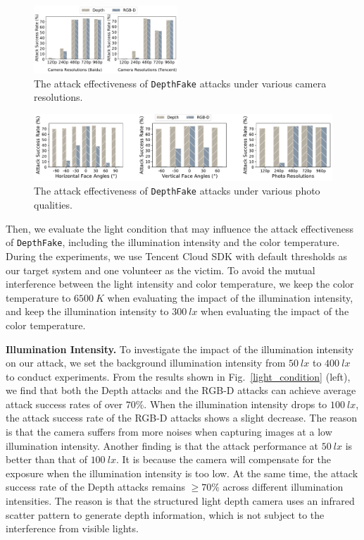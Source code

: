 \begin{figure}[pt]
	\centerline{\includegraphics[width = 0.48\textwidth]{figures/camera_resolution.pdf}}
	\vspace{-0.15in}
	\caption{The attack effectiveness of \texttt{DepthFake} attacks under various camera resolutions.}
	\label{camera_resolution}
	\vspace{-0.15in}
\end{figure}


\begin{figure}[pt]
	\centerline{\includegraphics[width = \textwidth]{figures/photo_quality.pdf}}
	\vspace{-0.15in}
	\caption{The attack effectiveness of \texttt{DepthFake} attacks under various photo qualities. }
	\label{photo_quality}
	\vspace{-0.15in}
\end{figure}


Then, we evaluate the light condition that may influence the attack effectiveness of \texttt{DepthFake}, including the illumination intensity and the color temperature. During the experiments, we use Tencent Cloud SDK with default thresholds as our target system and one volunteer as the victim.  
To avoid the mutual interference between the light intensity and color temperature, we keep the color temperature to $6500~K$ when evaluating the impact of the illumination intensity, and keep the illumination intensity to $300~lx$ when evaluating the impact of the color temperature.

\textbf{Illumination Intensity.} To investigate the impact of the illumination intensity on our attack, we set the background illumination intensity from $50~lx$ to $400~lx$ to conduct experiments.
From the results shown in Fig.~\ref{light_condition} (left), we find that both the Depth attacks and the RGB-D attacks can achieve average attack success rates of over $70\%$.
When the illumination intensity drops to $100~lx$, the attack success rate of the RGB-D attacks shows a slight decrease.
The reason is that the camera suffers from more noises when capturing images at a low illumination intensity. Another finding is that the attack performance at $50~lx$ is better than that of $100~lx$. It is because the camera will compensate for the exposure when the illumination intensity is too low.
At the same time, the attack success rate of the Depth attacks remains $\geq$$70\%$ across different illumination intensities. The reason is that the structured light depth camera uses an infrared scatter pattern to generate depth information, which is not subject to the interference from visible lights.


